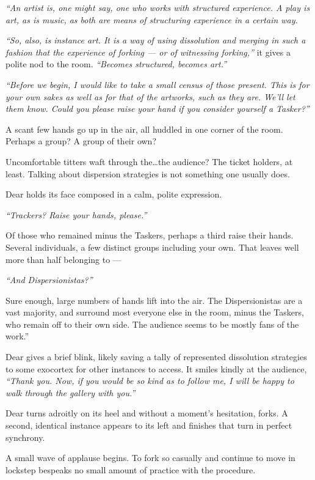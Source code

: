 \emph{``An artist is, one might say, one who works with structured experience. A play is art, as is music, as both are means of structuring experience in a certain way.}

\emph{``So, also, is instance art. It is a way of using dissolution and merging in such a fashion that the experience of forking --- or of witnessing forking,''} it gives a polite nod to the room. \emph{``Becomes structured, becomes art.''}

\emph{``Before we begin, I would like to take a small census of those present. This is for your own sakes as well as for that of the artworks, such as they are. We'll let them know. Could you please raise your hand if you consider yourself a Tasker?''}

A scant few hands go up in the air, all huddled in one corner of the room. Perhaps a group? A group of their own?

Uncomfortable titters waft through the\ldots{}the audience? The ticket holders, at least. Talking about dispersion strategies is not something one usually does.

Dear holds its face composed in a calm, polite expression.

\emph{``Trackers? Raise your hands, please.''}

Of those who remained minus the Taskers, perhaps a third raise their hands. Several individuals, a few distinct groups including your own. That leaves well more than half belonging to ---

\emph{``And Dispersionistas?''}

Sure enough, large numbers of hands lift into the air. The Dispersionistas are a vast majority, and surround most everyone else in the room, minus the Taskers, who remain off to their own side. The audience seems to be mostly fans of the work.''

Dear gives a brief blink, likely saving a tally of represented dissolution strategies to some exocortex for other instances to access. It smiles kindly at the audience, \emph{``Thank you. Now, if you would be so kind as to follow me, I will be happy to walk through the gallery with you.''}

Dear turns adroitly on its heel and without a moment's hesitation, forks. A second, identical instance appears to its left and finishes that turn in perfect synchrony.

A small wave of applause begins. To fork so casually and continue to move in lockstep bespeaks no small amount of practice with the procedure.

